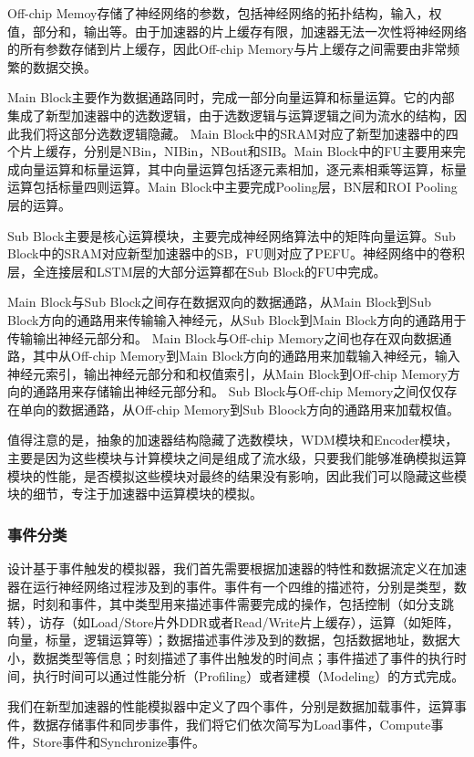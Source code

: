 Off-chip Memoy存储了神经网络的参数，包括神经网络的拓扑结构，输入，权值，部分和，输出等。由于加速器的片上缓存有限，加速器无法一次性将神经网络的所有参数存储到片上缓存，因此Off-chip Memory与片上缓存之间需要由非常频繁的数据交换。

Main Block主要作为数据通路同时，完成一部分向量运算和标量运算。它的内部集成了新型加速器中的选数逻辑，由于选数逻辑与运算逻辑之间为流水的结构，因此我们将这部分选数逻辑隐藏。
Main Block中的SRAM对应了新型加速器中的四个片上缓存，分别是NBin，NIBin，NBout和SIB。Main Block中的FU主要用来完成向量运算和标量运算，其中向量运算包括逐元素相加，逐元素相乘等运算，标量运算包括标量四则运算。Main Block中主要完成Pooling层，BN层和ROI Pooling层的运算。

Sub Block主要是核心运算模块，主要完成神经网络算法中的矩阵向量运算。Sub Block中的SRAM对应新型加速器中的SB，FU则对应了PEFU。神经网络中的卷积层，全连接层和LSTM层的大部分运算都在Sub Block的FU中完成。

Main Block与Sub Block之间存在数据双向的数据通路，从Main Block到Sub Block方向的通路用来传输输入神经元，从Sub Block到Main Block方向的通路用于传输输出神经元部分和。
Main Block与Off-chip Memory之间也存在双向数据通路，其中从Off-chip Memory到Main Block方向的通路用来加载输入神经元，输入神经元索引，输出神经元部分和和权值索引，从Main Block到Off-chip Memory方向的通路用来存储输出神经元部分和。
Sub Block与Off-chip Memory之间仅仅存在单向的数据通路，从Off-chip Memory到Sub Bloock方向的通路用来加载权值。

值得注意的是，抽象的加速器结构隐藏了选数模块，WDM模块和Encoder模块，主要是因为这些模块与计算模块之间是组成了流水级，只要我们能够准确模拟运算模块的性能，是否模拟这些模块对最终的结果没有影响，因此我们可以隐藏这些模块的细节，专注于加速器中运算模块的模拟。

\subsubsection{事件分类}

设计基于事件触发的模拟器，我们首先需要根据加速器的特性和数据流定义在加速器在运行神经网络过程涉及到的事件。事件有一个四维的描述符，分别是类型，数据，时刻和事件，其中类型用来描述事件需要完成的操作，包括控制（如分支跳转），访存（如Load/Store片外DDR或者Read/Write片上缓存），运算（如矩阵，向量，标量，逻辑运算等）；数据描述事件涉及到的数据，包括数据地址，数据大小，数据类型等信息；时刻描述了事件出触发的时间点；事件描述了事件的执行时间，执行时间可以通过性能分析（Profiling）或者建模（Modeling）的方式完成。

我们在新型加速器的性能模拟器中定义了四个事件，分别是数据加载事件，运算事件，数据存储事件和同步事件，我们将它们依次简写为Load事件，Compute事件，Store事件和Synchronize事件。

